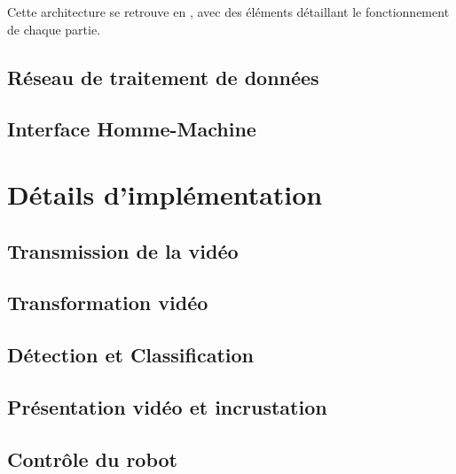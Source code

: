 			Cette architecture se retrouve en \todoref, avec des éléments détaillant le fonctionnement de chaque partie.

		\subsection{Réseau de traitement de données}

			
		\subsection{Interface Homme-Machine}
		

	\section{Détails d'implémentation}
	
		\subsection{Transmission de la vidéo}
		
			
		\subsection{Transformation vidéo}
		

		\subsection{Détection et Classification}
		
			
		\subsection{Présentation vidéo et incrustation}
		
			
		\subsection{Contrôle du robot}
		
